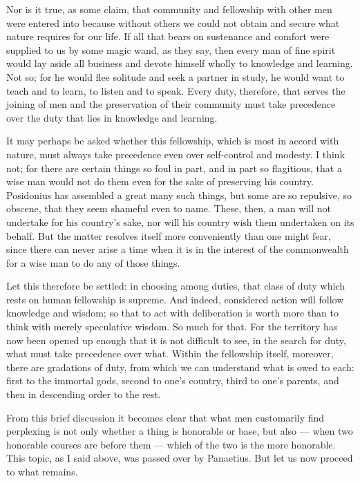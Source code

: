 Nor is it true, as some claim, that community and fellowship with other men were entered into because without others we could not obtain and secure what nature requires for our life. If all that bears on sustenance and comfort were supplied to us by some magic wand, as they say, then every man of fine spirit would lay aside all business and devote himself wholly to knowledge and learning. Not so; for he would flee solitude and seek a partner in study, he would want to teach and to learn, to listen and to speak. Every duty, therefore, that serves the joining of men and the preservation of their community must take precedence over the duty that lies in knowledge and learning.

 It may perhaps be asked whether this fellowship, which is most in accord with nature, must always take precedence even over self-control and modesty. I think not; for there are certain things so foul in part, and in part so flagitious, that a wise man would not do them even for the sake of preserving his country. Posidonius has assembled a great many such things, but some are so repulsive, so obscene, that they seem shameful even to name. These, then, a man will not undertake for his country's sake, nor will his country wish them undertaken on its behalf. But the matter resolves itself more conveniently than one might fear, since there can never arise a time when it is in the interest of the commonwealth for a wise man to do any of those things.

 Let this therefore be settled: in choosing among duties, that class of duty which rests on human fellowship is supreme. And indeed, considered action will follow knowledge and wisdom; so that to act with deliberation is worth more than to think with merely speculative wisdom. So much for that. For the territory has now been opened up enough that it is not difficult to see, in the search for duty, what must take precedence over what. Within the fellowship itself, moreover, there are gradations of duty, from which we can understand what is owed to each: first to the immortal gods, second to one's country, third to one's parents, and then in descending order to the rest.

 From this brief discussion it becomes clear that what men customarily find perplexing is not only whether a thing is honorable or base, but also — when two honorable courses are before them — which of the two is the more honorable. This topic, as I said above, was passed over by Panaetius. But let us now proceed to what remains.

